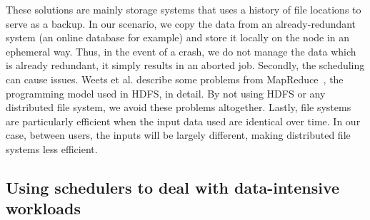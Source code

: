 \documentclass[conference,10pt]{IEEEtran}
\begin{document}
These solutions are mainly storage systems that uses a history of file locations to serve as a backup.
In our scenario, we copy the data from an already-redundant system (an online database for example)
and store it locally on the node in an ephemeral way.
Thus, in the event of a crash, we do not manage the data which is already redundant, it simply results in an aborted job.
Secondly, the scheduling can cause issues. Weets et al. describe some problems from
MapReduce~\cite{issue_with_hdfs}, the programming model used in HDFS, in detail.
By not using HDFS or any distributed file system, we avoid these problems altogether. 
Lastly, file systems are particularly efficient when the input data used are identical over time.
In our case, between users, the inputs will be largely different, making distributed file systems less efficient.




\subsection{Using schedulers to deal with data-intensive workloads}
\end{document}
